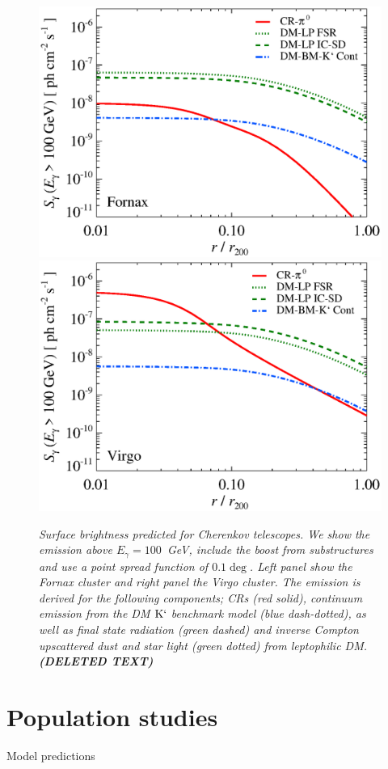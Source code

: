 \documentclass[10pt,aps,pra,reprint,amsmath,amsfonts,amssymb,showpacs]{revtex4-1}
\def\del#1{{\bf (DELETED TEXT)}}
\newcommand{\rmn}{\mathrm}
\newcommand{\eg}{E_\gamma}
\newcommand{\Km}{\rmn{K}`}
\begin{document}
\begin{figure}
\begin{minipage}{2.0\columnwidth}
  \includegraphics[width=0.49\columnwidth]{figures/SB.Fornax.v9.SF300.SubMass.elmu.eps}
  \includegraphics[width=0.49\columnwidth]{figures/SB.Virgo.v9.SF300.SubMass.elmu.eps}
\caption{\it Surface brightness predicted for Cherenkov telescopes. We
  show the emission above $\eg=100$~GeV, include the boost from
  substructures and use a point spread function of $0.1\deg$. Left
  panel show the Fornax cluster and right panel the Virgo cluster. The
  emission is derived for the following components; CRs (red solid),
  continuum emission from the DM $\Km$ benchmark model (blue
  dash-dotted), as well as final state radiation (green dashed) and
  inverse Compton upscattered dust and star light (green dotted) from
  leptophilic DM. \del{GeV energies give rise to small BM model fluxes
    but high LP fluxes, other words BM models good for Cerenkov
    telescopes and LP good for Fermi (although the flat LP spectra
    give rise to high fluxes at high energies as well).}}
 \label{fig13}
\end{minipage}
\end{figure}

\section{Population studies}
Model predictions
\end{document}
